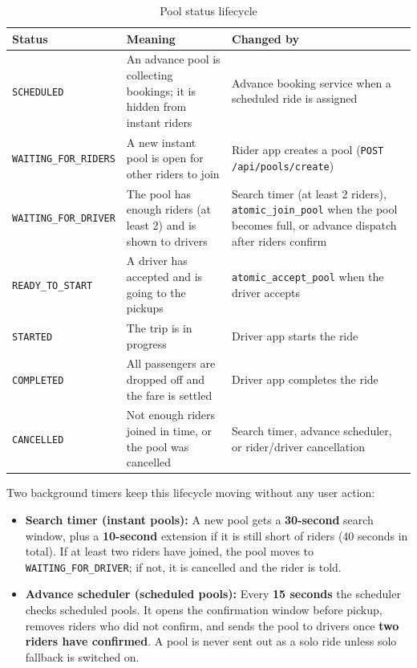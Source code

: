\begin{table}[H]
  \centering
  \small
  \caption{Pool status lifecycle}
  \label{tab:pool-status}
  \begin{tabularx}{\textwidth}{@{}p{3.8cm}LL@{}}
    \toprule
    \textbf{Status} & \textbf{Meaning} & \textbf{Changed by} \\
    \midrule
    \texttt{SCHEDULED} & An advance pool is collecting bookings; it is hidden from instant riders & Advance booking service when a scheduled ride is assigned \\
    \texttt{WAITING\_FOR\_RIDERS} & A new instant pool is open for other riders to join & Rider app creates a pool (\texttt{POST /api/pools/create}) \\
    \texttt{WAITING\_FOR\_DRIVER} & The pool has enough riders (at least 2) and is shown to drivers & Search timer (at least 2 riders), \texttt{atomic\_join\_pool} when the pool becomes full, or advance dispatch after riders confirm \\
    \texttt{READY\_TO\_START} & A driver has accepted and is going to the pickups & \texttt{atomic\_accept\_pool} when the driver accepts \\
    \texttt{STARTED} & The trip is in progress & Driver app starts the ride \\
    \texttt{COMPLETED} & All passengers are dropped off and the fare is settled & Driver app completes the ride \\
    \texttt{CANCELLED} & Not enough riders joined in time, or the pool was cancelled & Search timer, advance scheduler, or rider/driver cancellation \\
    \bottomrule
  \end{tabularx}
\end{table}

Two background timers keep this lifecycle moving without any user action:

\begin{itemize}
  \item \textbf{Search timer (instant pools):} A new pool gets a
        \textbf{30-second} search window, plus a \textbf{10-second} extension
        if it is still short of riders (40 seconds in total). If at least two
        riders have joined, the pool moves to
        \texttt{WAITING\_FOR\_DRIVER}; if not, it is cancelled and the rider is
        told.
  \item \textbf{Advance scheduler (scheduled pools):} Every \textbf{15
        seconds} the scheduler checks scheduled pools. It opens the
        confirmation window before pickup, removes riders who did not confirm,
        and sends the pool to drivers once \textbf{two riders have confirmed}.
        A pool is never sent out as a solo ride unless solo fallback is
        switched on.
\end{itemize}

